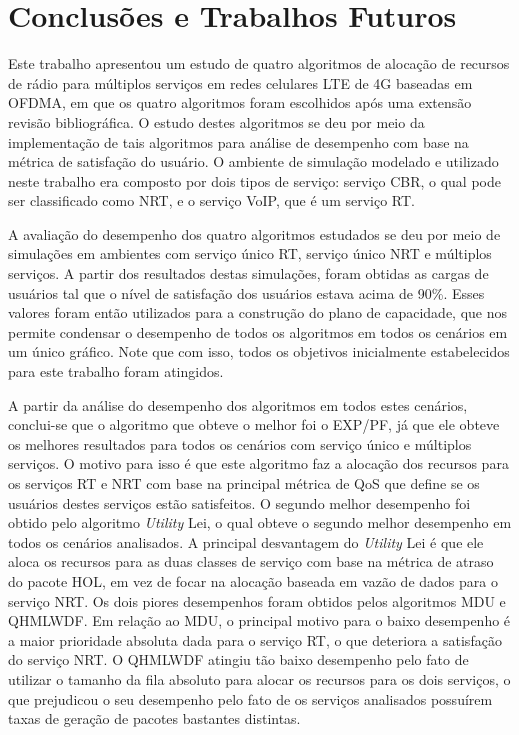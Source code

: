 \chapter[Conclusões e Trabalhos Futuros]{Conclusões e Trabalhos Futuros}

Este trabalho apresentou um estudo de quatro algoritmos de alocação de recursos de rádio para múltiplos serviços em redes celulares LTE de 4G baseadas em OFDMA, em que os quatro algoritmos foram escolhidos após uma extensão revisão bibliográfica. O estudo destes algoritmos se deu por meio da implementação de tais algoritmos para análise de desempenho com base na métrica de satisfação do usuário. O ambiente de simulação modelado e utilizado neste trabalho era composto por dois tipos de serviço: serviço CBR, o qual pode ser classificado como NRT, e o serviço VoIP, que é um serviço RT. 

A avaliação do desempenho dos quatro algoritmos estudados se deu por meio de simulações em ambientes com serviço único RT, serviço único NRT e múltiplos serviços. A partir dos resultados destas simulações, foram obtidas as cargas de usuários tal que o nível de satisfação dos usuários estava acima de 90\%. Esses valores foram então utilizados para a construção do plano de capacidade, que nos permite condensar o desempenho de todos os algoritmos em todos os cenários em um único gráfico. Note que com isso, todos os objetivos inicialmente estabelecidos para este trabalho foram atingidos. 

A partir da análise do desempenho dos algoritmos em todos estes cenários, conclui-se que o algoritmo que obteve o melhor foi o EXP/PF, já que ele obteve os melhores resultados para todos os cenários com serviço único e múltiplos serviços. O motivo para isso é que este algoritmo faz a alocação dos recursos para os serviços RT e NRT com base na principal métrica de QoS que define se os usuários destes serviços estão satisfeitos. O segundo melhor desempenho foi obtido pelo algoritmo \textit{Utility} Lei, o qual obteve o segundo melhor desempenho em todos os cenários analisados. A principal desvantagem do \textit{Utility} Lei é que ele aloca os recursos para as duas classes de serviço com base na métrica de atraso do pacote HOL, em vez de focar na alocação baseada em vazão de dados para o serviço NRT. Os dois piores desempenhos foram obtidos pelos algoritmos MDU e QHMLWDF. Em relação ao MDU, o principal motivo para o baixo desempenho é a maior prioridade absoluta dada para o serviço RT, o que deteriora a satisfação do serviço NRT. O QHMLWDF atingiu tão baixo desempenho pelo fato de utilizar o tamanho da fila absoluto para alocar os recursos para os dois serviços, o que prejudicou o seu desempenho pelo fato de os serviços analisados possuírem taxas de geração de pacotes bastantes distintas.   

